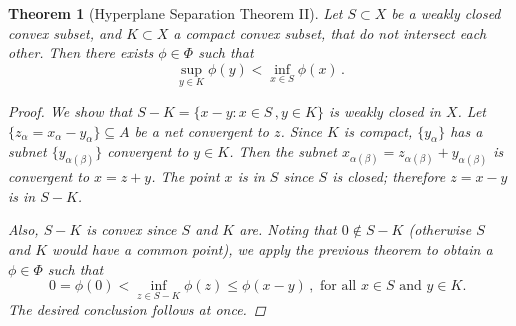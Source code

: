 \documentclass[12pt]{article}
\newtheorem{thm}{Theorem}
\begin{document}
\begin{thm}[Hyperplane Separation Theorem II]
Let $S \subset X$ be a weakly closed convex subset,
and $K \subset X$ a compact convex subset,
that do not intersect each other.
Then there exists $\phi \in \Phi$ such that 
\[
\sup_{y \in K} \phi(y) < \inf_{x \in S} \phi(x)\,.
\]
\begin{proof}
We show that 
$S - K = \{ x - y \colon x \in S\,, y \in K\}$
 is weakly closed in $X$.
Let $\{ z_\alpha = x_\alpha - y_\alpha\} \subseteq A$ 
be a net convergent to $z$.
Since $K$ is compact, $\{ y_\alpha \}$ has a subnet $\{ y_{\alpha(\beta)} \}$
convergent to $y \in K$.
Then the subnet $x_{\alpha(\beta)} = z_{\alpha(\beta)} + y_{\alpha(\beta)}$
is convergent to $x = z + y$.
The point $x$ is in $S$ since $S$ is closed;
therefore $z = x-y$ is in $S - K$.

Also, $S-K$ is convex since $S$ and $K$ are.
Noting that $0 \notin S-K$ (otherwise $S$ and $K$ would have a common point),
we apply the previous theorem to
obtain a $\phi \in \Phi$ such
that 
\[
0 = \phi(0) < \inf_{z \in S-K} \phi(z) \leq \phi(x-y) \,, \text{ for all $x \in S$ and $y \in K$. }
\]
The desired conclusion follows at once.
\end{proof}
\end{thm}

\end{document}
